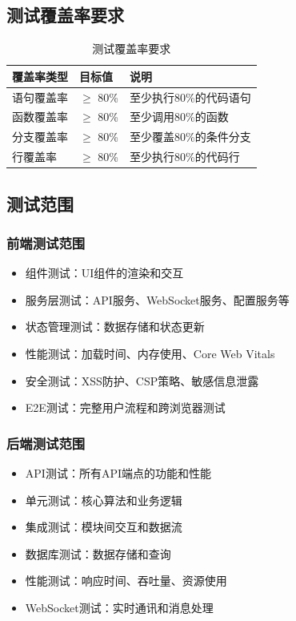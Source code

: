\documentclass[12pt,a4paper,openany]{report}
\begin{document}
\subsection{测试覆盖率要求}

\begin{table}[h]
\centering
\caption{测试覆盖率要求}
\begin{tabular}{|l|l|l|}
\hline
\textbf{覆盖率类型} & \textbf{目标值} & \textbf{说明} \\
\hline
语句覆盖率 & $\ge$ 80\% & 至少执行80\%的代码语句 \\
函数覆盖率 & $\ge$ 80\% & 至少调用80\%的函数 \\
分支覆盖率 & $\ge$ 80\% & 至少覆盖80\%的条件分支 \\
行覆盖率 & $\ge$ 80\% & 至少执行80\%的代码行 \\
\hline
\end{tabular}
\end{table}

\subsection{测试范围}

\subsubsection{前端测试范围}

\begin{itemize}
    \item 组件测试：UI组件的渲染和交互
    \item 服务层测试：API服务、WebSocket服务、配置服务等
    \item 状态管理测试：数据存储和状态更新
    \item 性能测试：加载时间、内存使用、Core Web Vitals
    \item 安全测试：XSS防护、CSP策略、敏感信息泄露
    \item E2E测试：完整用户流程和跨浏览器测试
\end{itemize}

\subsubsection{后端测试范围}

\begin{itemize}
    \item API测试：所有API端点的功能和性能
    \item 单元测试：核心算法和业务逻辑
    \item 集成测试：模块间交互和数据流
    \item 数据库测试：数据存储和查询
    \item 性能测试：响应时间、吞吐量、资源使用
    \item WebSocket测试：实时通讯和消息处理
\end{itemize}
\end{document}
